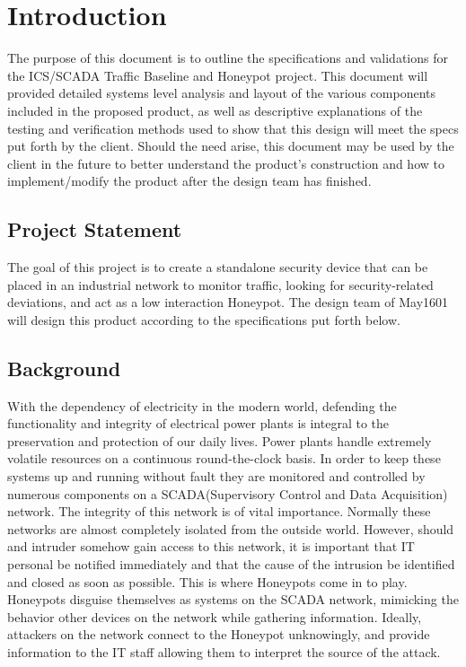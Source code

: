 \chapter{Introduction}

The purpose of this document is to outline the specifications and validations for the ICS/SCADA Traffic Baseline and Honeypot project. This document will provided detailed systems level analysis and layout of the various components included in the proposed product, as well as descriptive explanations of the testing and verification methods used to show that this design will meet the specs put forth by the client. Should the need arise, this document may be used by the client in the future to better understand the product's construction and how to implement/modify the product after the design team has finished.

\section{Project Statement}

 The goal of this project is to create a standalone security device that can be placed in an industrial network to monitor traffic, looking for security-related deviations, and act as a low interaction Honeypot. The design team of May1601 will design this product according to the specifications put forth below.

\section{Background}

With the dependency of electricity in the modern world, defending the functionality and integrity of electrical power plants is integral to the preservation and protection of our daily lives. Power plants handle extremely volatile resources on a continuous round-the-clock basis. In order to keep these systems up and running without fault they are monitored and controlled by numerous components on a SCADA(Supervisory Control and Data Acquisition) network. The integrity of this network is of vital importance. Normally these networks are almost completely isolated from the outside world. However, should and intruder somehow gain access to this network, it is important that IT personal be notified immediately and that the cause of the intrusion be identified and closed as soon as possible. This is where Honeypots come in to play. Honeypots disguise themselves as systems on the SCADA network, mimicking the behavior other devices on the network while gathering information. Ideally, attackers on the network connect to the Honeypot unknowingly, and provide information to the IT staff allowing them to interpret the source of the attack. 

